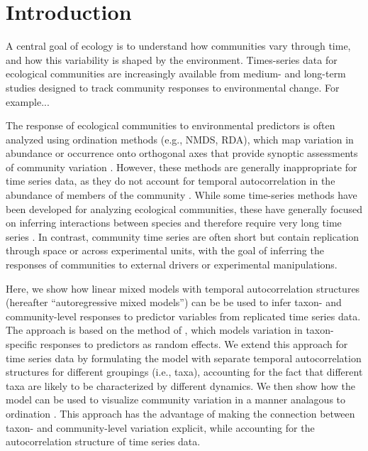 \section*{Introduction}

A central goal of ecology is to understand how communities vary through time, and
how this variability is shaped by the environment.
Times-series data for ecological communities are increasingly available
from medium- and long-term studies designed to track community responses
to environmental change. For example...

The response of ecological communities to environmental predictors is often analyzed using
ordination methods (e.g., NMDS, RDA),
which map variation in abundance or occurrence onto orthogonal
axes that provide synoptic assessments of community variation \citep{Mcgarigal2013}.
However, these methods are generally inappropriate for time series data,
as they do not account
for temporal autocorrelation in the abundance of members of the community \citep{Ives2006}.
While some time-series methods have been developed for analyzing ecological communities,
these have generally focused on inferring interactions between species and therefore
require very long time series \citep{Ives1999, Hampton2013}.
In contrast, community time series are often short but
contain replication through space or across experimental units, with the goal of inferring
the responses of communities to external drivers or experimental manipulations.

Here, we show how linear mixed models with temporal autocorrelation structures
(hereafter ``autoregressive mixed models'') can be be used to infer taxon- and
community-level responses to predictor variables from replicated time series data. The
approach is based on the method of \cite{Jackson2012},
which models variation in taxon-specific responses to predictors as
random effects.
We extend this approach for time series data by formulating the model with separate
temporal autocorrelation structures for different groupings (i.e., taxa),
accounting for the fact that different taxa are likely to be characterized by
different dynamics. We then show how the model can be used to visualize
community variation in a manner analagous to ordination
\citep[following ][]{Jackson2012}.
This approach has the advantage of making the connection between
taxon- and community-level variation explicit, while accounting for the autocorrelation
structure of time series data.

